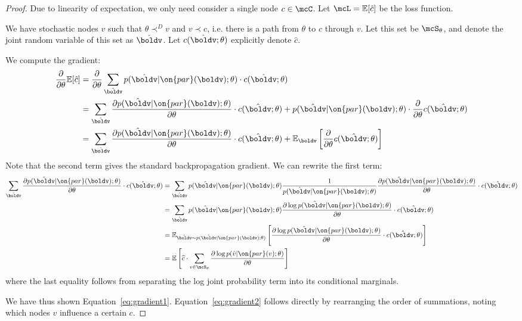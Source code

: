 \documentclass[12pt]{report}
\begin{document}
\begin{proof}
Due to linearity of expectation, we only need consider a single node $c \in \mcC$. Let $\mcL = \mathbb{E}[\hat{c}]$ be the loss function.

We have stochastic nodes $v$ such that $\theta \prec^D v$ and $v \prec c$, i.e. there is a path from $\theta$ to $c$ through $v$. Let this set be $\mcS_\theta$, and denote the joint random variable of this set as $\hat{\boldv}$. Let $c(\hat{\boldv} ; \theta)$ explicitly denote $\hat{c}$.

We compute the gradient:
\begin{align*}
\frac{\partial }{\partial \theta}\mathbb{E}[\hat{c}] &= \frac{\partial}{\partial \theta} \sum_{\hat{\boldv}} p(\hat{\boldv} | \on{par}(\boldv); \theta) \cdot c(\hat{\boldv}; \theta) \\
& = \sum_{\hat{\boldv}} \frac{ \partial  p(\hat{\boldv} | \on{par}(\boldv); \theta) } {\partial \theta} \cdot c(\hat{\boldv} ; \theta) + p(\hat{\boldv} | \on{par}(\boldv); \theta) \cdot \frac{\partial}{\partial\theta} c(\hat{\boldv}; \theta) \\
&= \sum_{\hat{\boldv}} \frac{ \partial  p(\hat{\boldv} | \on{par}(\boldv); \theta) } {\partial \theta} \cdot c(\hat{\boldv} ; \theta) + \mathbb{E}_{\boldv}\left[ \frac{\partial}{\partial\theta} c(\hat{\boldv}; \theta)  \right]
\end{align*}
Note that the second term gives the standard backpropagation gradient. We can rewrite the first term:
\begin{align*}
\sum_{\hat{\boldv}} \frac{ \partial  p(\hat{\boldv} | \on{par}(\boldv); \theta) } {\partial \theta} \cdot c(\hat{\boldv} ; \theta)
&= \sum_{\hat{\boldv}} p(\hat{\boldv} | \on{par}(\boldv); \theta) \frac{1}{p(\hat{\boldv}|\on{par}(\boldv);\theta)}\frac{ \partial  p(\hat{\boldv} | \on{par}(\boldv); \theta) } {\partial \theta} \cdot c(\hat{\boldv}; \theta) \\
&= \sum_{\hat{\boldv}} p(\hat{\boldv} | \on{par}(\boldv); \theta) \frac{ \partial  \log p(\hat{\boldv} | \on{par}(\boldv); \theta) } {\partial \theta} \cdot c(\hat{\boldv}; \theta) \\
 &= \mathbb{E}_{\hat{\boldv} \sim p(\hat{\boldv} | \on{par}(\boldv); \theta)} \left[ \frac{ \partial  \log p(\hat{\boldv} | \on{par}(\boldv); \theta) } {\partial \theta} \cdot c(\hat{\boldv} ; \theta) \right] \\
&= \mathbb{E}\left[ \widehat{c} \cdot \sum_{v \in \mcS_\theta} \frac{  \partial  \log p(\hat{v} | \on{par}(v); \theta) } {\partial \theta}  \right]
\end{align*}
where the last equality follows from separating the log joint probability term into its conditional marginals.

We have thus shown Equation~\ref{eq:gradient1}. Equation~\ref{eq:gradient2} follows directly by rearranging the order of summations, noting which nodes $v$ influence a certain $c$.

\end{proof}
\end{document}
